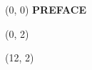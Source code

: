 \documentclass[10pt]{article}
\begin{document}
\begin{textblock}{23}(0, 0)
    \center\huge\textbf{PREFACE}
\end{textblock}

\begin{textblock}{11}(0, 2)
    {}
    {}
\end{textblock}

\begin{textblock}{11}(12, 2)
    {}
    {}
\end{textblock}
\end{document}
